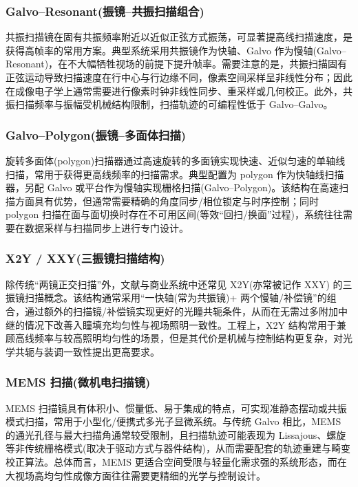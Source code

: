 \subsubsection{Galvo–Resonant(振镜–共振扫描组合)}
共振扫描镜在固有共振频率附近以近似正弦方式振荡，可显著提高线扫描速度，是获得高帧率的常用方案。典型系统采用共振镜作为快轴、Galvo 作为慢轴(Galvo–Resonant)，在不大幅牺牲视场的前提下提升帧率。需要注意的是，共振扫描固有正弦运动导致扫描速度在行中心与行边缘不同，像素空间采样呈非线性分布；因此在成像电子学上通常需要进行像素时钟非线性同步、重采样或几何校正。此外，共振扫描频率与振幅受机械结构限制，扫描轨迹的可编程性低于 Galvo–Galvo。

\subsubsection{Galvo–Polygon(振镜–多面体扫描)}
旋转多面体(polygon)扫描器通过高速旋转的多面镜实现快速、近似匀速的单轴线扫描，常用于获得更高线频率的扫描需求。典型配置为 polygon 作为快轴线扫描器，另配 Galvo 或平台作为慢轴实现栅格扫描(Galvo–Polygon)。该结构在高速扫描方面具有优势，但通常需要精确的角度同步/相位锁定与时序控制；同时 polygon 扫描在面与面切换时存在不可用区间(等效``回扫/换面''过程)，系统往往需要在数据采样与扫描同步上进行专门设计。

\subsubsection{X2Y / XXY(三振镜扫描结构)}
除传统``两镜正交扫描''外，文献与商业系统中还常见 X2Y(亦常被记作 XXY) 的三振镜扫描概念。该结构通常采用``一快轴(常为共振镜)+ 两个慢轴/补偿镜''的组合\cite{RN1325}，通过额外的扫描镜/补偿镜实现更好的光瞳共轭条件，从而在无需过多附加中继的情况下改善入瞳填充均匀性与视场照明一致性。工程上，X2Y 结构常用于兼顾高线频率与较高照明均匀性的场景，但是其代价是机械与控制结构更复杂，对光学共轭与装调一致性提出更高要求。

\subsubsection{MEMS 扫描(微机电扫描镜)}
MEMS 扫描镜具有体积小、惯量低、易于集成的特点，可实现准静态摆动或共振模式扫描，常用于小型化/便携式多光子显微系统。与传统 Galvo 相比，MEMS 的通光孔径与最大扫描角通常较受限制，且扫描轨迹可能表现为 Lissajous、螺旋等非传统栅格模式(取决于驱动方式与器件结构)，从而需要配套的轨迹重建与畸变校正算法。总体而言，MEMS 更适合空间受限与轻量化需求强的系统形态，而在大视场高均匀性成像方面往往需要更精细的光学与控制设计。


